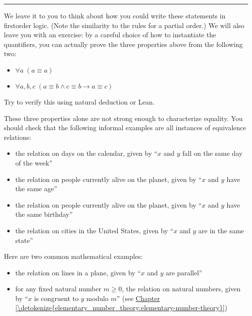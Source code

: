 \documentclass[letterpaper,10pt,english]{sphinxmanual}
\begin{document}
\bigskip\hrule\bigskip


\sphinxAtStartPar
We leave it to you to think about how you could write these statements in first\sphinxhyphen{}order logic. (Note the similarity to the rules for a partial order.) We will also leave you with an exercise: by a careful choice of how to instantiate the quantifiers, you can actually prove the three properties above from the following two:
\begin{itemize}
\item {} 
\sphinxAtStartPar
\(\forall a \; (a \equiv a)\)

\item {} 
\sphinxAtStartPar
\(\forall {a, b, c} \; (a \equiv b \wedge c \equiv b \to a \equiv c)\)

\end{itemize}

\sphinxAtStartPar
Try to verify this using natural deduction or Lean.

\sphinxAtStartPar
These three properties alone are not strong enough to characterize equality. You should check that the following informal examples are all instances of equivalence relations:
\begin{itemize}
\item {} 
\sphinxAtStartPar
the relation on days on the calendar, given by “\(x\) and \(y\) fall on the same day of the week”

\item {} 
\sphinxAtStartPar
the relation on people currently alive on the planet, given by “\(x\) and \(y\) have the same age”

\item {} 
\sphinxAtStartPar
the relation on people currently alive on the planet, given by “\(x\) and \(y\) have the same birthday”

\item {} 
\sphinxAtStartPar
the relation on cities in the United States, given by “\(x\) and \(y\) are in the same state”

\end{itemize}

\sphinxAtStartPar
Here are two common mathematical examples:
\begin{itemize}
\item {} 
\sphinxAtStartPar
the relation on lines in a plane, given by “\(x\) and \(y\) are parallel”

\item {} 
\sphinxAtStartPar
for any fixed natural number \(m \geq 0\), the relation on natural numbers, given by “\(x\) is congruent to \(y\) modulo \(m\)” (see \hyperref[\detokenize{elementary_number_theory:elementary-number-theory}]{Chapter \ref{\detokenize{elementary_number_theory:elementary-number-theory}}})

\end{itemize}
\end{document}
